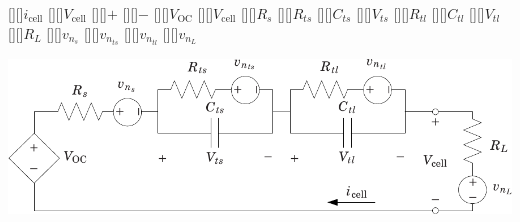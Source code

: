 [][]{$i_\text{cell}$}
[][]{$V_\text{cell}$}
\psfrag{+}[][]{$+$}
\psfrag{-}[][]{$-$}
[][]{$V_\text{OC}$}
[][]{$V_\text{cell}$}
[][]{$R_s$}
[][]{$R_{ts}$}
[][]{$C_{ts}$}
[][]{$V_{ts}$}
[][]{$R_{tl}$}
[][]{$C_{tl}$}
[][]{$V_{tl}$}
[][]{$R_L$}
[][]{$v_{n_s}$}
[][]{$v_{n_{ts}}$}
[][]{$v_{n_{tl}}$}
[][]{$v_{n_L}$}

\centering
\includegraphics[width=\columnwidth]{batt_noisy}